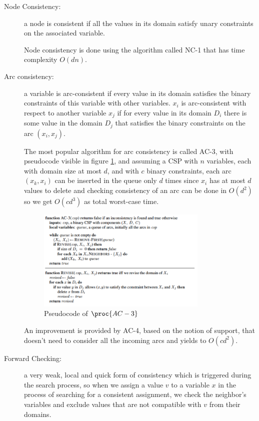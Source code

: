 \begin{description}
   \item [Node Consistency:] a node is consistent if all the values in its 
	   domain satisfy unary constraints on the associated variable.
	
	   Node consistency is done using the algorithm called NC-1 that 
           has time complexity $O(dn)$.
   \item [Arc consistency:] a variable is arc-consistent if every value in 
	   its domain satisfies the binary constraints of this variable with
           other variables.\newline
	   $x_i$ is arc-consistent with respect to another variable $x_j$ if
	   for every value in its domain $D_i$ there is some value in the
     domain $D_j$ that satisfies the binary constraints on the arc $(x_i, x_j)$.

     	   The most popular algorithm for arc consistency is called AC-3, with
	   pseudocode visible in figure \ref{img:ac3}, and assuming a CSP with
	   $n$ variables, each with domain size at most $d$, and with $c$
	   binary constraints, each arc $(x_k, x_i)$ can be inserted in the 
	   queue only $d$ times since $x_i$ has at most $d$ values to delete
	   and checking consistency of an arc can be done in $O(d^2)$ so 
	   we get $O(cd^3)$ as total worst-case time.

	   \begin{figure}
		   \includegraphics[width=0.8\textwidth]{Images/ac-3}
		   \caption{Pseudocode of $\proc{AC-3}$}
		   \label{img:ac3}
	   \end{figure}

          An improvement is provided by AC-4, based on the notion of support, 
	  that doesn't need to consider all the incoming arcs and yields to
	  $O(cd^2)$.
  \item [Forward Checking:] a very weak, local and quick form of consistency
	  which is triggered during the search process, so when we assign a 
	  value $v$ to a variable $x$ in the process of searching for a 
	  consistent assignment, we check the neighbor's variables and exclude
	  values that are not compatible with $v$ from their domains.


\end{description}
